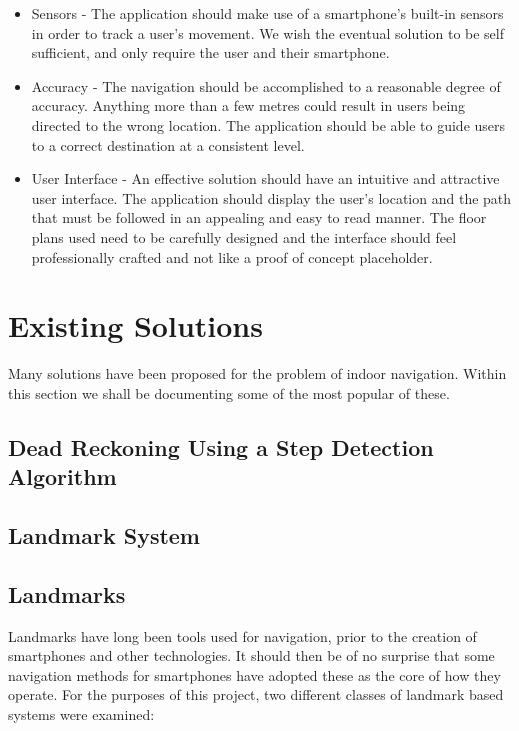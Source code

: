 \documentclass[12pt,a4paper]{report}
\begin{document}
\begin{itemize}
\item Sensors - The application should make use of a smartphone's built-in sensors in order to track a user's movement. We wish the eventual solution to be self sufficient, and only require the user and their smartphone.

\item Accuracy - The navigation should be accomplished to a reasonable degree of accuracy. Anything more than a few metres could result in users being directed to the wrong location. The application should be able to guide users to a correct destination at a consistent level.

\item User Interface - An effective solution should have an intuitive and attractive user interface. The application should display the user's location and the path that must be followed in an appealing and easy to read manner. The floor plans used need to be carefully designed and the interface should feel professionally crafted and not like a proof of concept placeholder.

\end{itemize}

\chapter{Existing Solutions}

Many solutions have been proposed for the problem of indoor navigation. Within this section we shall be documenting some of the most popular of these.

\section{Dead Reckoning Using a Step Detection Algorithm}

\section{Landmark System}

\section{Landmarks}

Landmarks have long been tools used for navigation, prior to the creation of smartphones and other technologies. It should then be of no surprise that some navigation methods for smartphones have adopted these as the core of how they operate. For the purposes of this project, two different classes of landmark based systems were examined:
\end{document}
